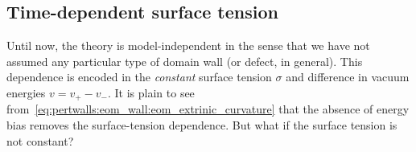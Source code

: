 






\subsection{Time-dependent surface tension}\label{sec:pertwalls:thinwall:time_dep_surface_tension}
    Until now, the theory is model-independent in the sense that we have not assumed any particular type of domain wall (or defect, in general). This dependence is encoded in the \emph{constant} surface tension $\sigma$ and difference in vacuum energies $v=v_+-v_-$. %
    It is plain to see from~\cref{eq:pertwalls:eom_wall:eom_extrinic_curvature} that the absence of energy bias removes the surface-tension dependence. %
    But what if the surface tension is not constant?


